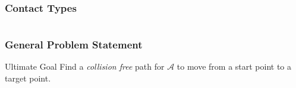 \documentclass[ucs,9pt,pagenumbersfull]{beamer}
\begin{document}
\begin{frame}
  \frametitle{Contact Types}
  \begin{columns}[c]
    \begin{column}{0.4\textwidth}
      \begin{minipage}[c][\textheight]{\columnwidth}

      \end{minipage}
    \end{column}
    \begin{column}{0.55\textwidth}
      \begin{minipage}[c][\textheight]{\columnwidth}
        \begin{center}
          
        \end{center}
      \end{minipage}
    \end{column}
  \end{columns}
\end{frame}

\begin{frame}
  \frametitle{General Problem Statement}
  \begin{block}{Ultimate Goal}
    Find a \emph{collision free} path for \(\mathcal{A}\) to move from a start point to a
    target point.
  \end{block}

  \begin{figure}
    \centering
    
  \end{figure}
\end{frame}
\end{document}
